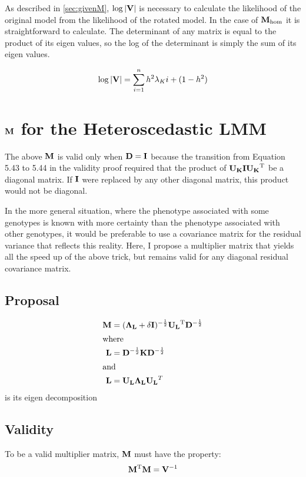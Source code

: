 As described in \cref{sec:givenM}, $\log \left| \mathbf{V} \right|$ is necessary to calculate the likelihood of the original model from the likelihood of the rotated model.
In the case of $\mathbf{M}_\text{hom}$ it is straightforward to calculate.
The determinant of any matrix is equal to the product of its eigen values, so the log of the determinant is simply the sum of its eigen values.

\begin{align}
  \log \left| \mathbf{V} \right| = \sum_{i=1}^n{h^2 \lambda_Ki + (1 - h^2)}
\end{align}


\section{\texorpdfstring{$\mathbf{M}$}{M} for the Heteroscedastic LMM}

The above $\mathbf{M}$ is valid only when $\mathbf{D} = \mathbf{I}$ because the transition from Equation 5.43 to 5.44 in the validity proof required that the product of $\mathbf{U_K} \mathbf{I} \mathbf{U_K}^\mathrm{T}$ be a diagonal matrix.
If $\mathbf{I}$ were replaced by any other diagonal matrix, this product would not be diagonal.

In the more general situation, where the phenotype associated with some genotypes is known with more certainty than the phenotype associated with other genotypes, it would be preferable to use a covariance matrix for the residual variance that reflects this reality.
Here, I propose a multiplier matrix that yields all the speed up of the above trick, but remains valid for any diagonal residual covariance matrix.

\subsection{Proposal}

\begin{align}
	\mathbf{M} &= (\mathbf{\Lambda_L} + \delta \mathbf{I})^{-\frac{1}{2}}\mathbf{U_L}^\mathrm{T} \mathbf{D}^{-\frac{1}{2}}\\
\shortintertext{where}
	\mathbf{L} &= \mathbf{D}^{-\frac{1}{2}}\mathbf{K} \mathbf{D}^{-\frac{1}{2}}\\
\shortintertext{and}
	\mathbf{L} &= \mathbf{U_L} \mathbf{\Lambda_L} \mathbf{U_L}^T
\end{align}
is its eigen decomposition


\subsection{Validity}

To be a valid multiplier matrix, $\mathbf{M}$ must have the property:
\begin{equation}
  \mathbf{M} ^\mathrm{T} \mathbf{M} = \mathbf{V}^{-1}
\end{equation}
	


